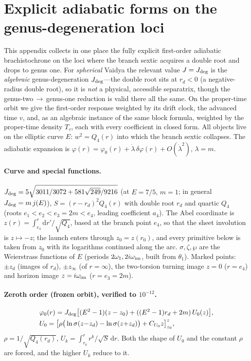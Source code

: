\documentclass[12pt]{iopart}
\newcommand{\Jc}{J_{\rm deg}}
\newcommand{\dd}{\mathrm{d}}
\theoremstyle{plain}
\theoremstyle{definition}
\theoremstyle{plain}
\theoremstyle{remark}
\begin{document}
\section{Explicit adiabatic forms on the genus-degeneration loci}
\label{app:degeneration}
This appendix collects in one place the fully explicit first-order adiabatic
brachistochrone on the loci where the branch sextic acquires a double root and drops to
genus one. For \emph{spherical} Vaidya the relevant value $J=\Jc$ is the \emph{algebraic}
genus-degeneration $J_{\rm deg}$---the double root sits at $r_d<0$
(a negative-radius double root), so it is \emph{not} a physical, accessible separatrix,
though the genus-two$\,\to\,$genus-one reduction is valid there all the same. On the
proper-time orbit we give the first-order response weighted by its drift clock, the
advanced time $v$, and, as an algebraic instance of the same block formula, weighted by the
proper-time density $T_\tau$, each with every coefficient in closed form. All objects live on
the elliptic curve $E:\,w^2=Q_4(r)$ into which the branch sextic collapses. The adiabatic expansion is
$\varphi(r)=\varphi_0(r)+\dot\lambda\,\delta\varphi(r)+O(\dot\lambda^2)$, $\lambda=m$.

\paragraph{Curve and special functions.}
$\Jc=5\sqrt{3011/3072+581\sqrt{249}/9216}$ (at $E=7/5,\,m=1$; in general $\Jc=m\,j(E)$),
$S=(r-r_d)^2Q_4(r)$ with double root $r_d$ and quartic $Q_4$ (roots
$e_1<e_2<e_3=2m<e_4$, leading coefficient $a_4$). The Abel coordinate is
$z(r)=\int_{e_4}^r\dd r'/\sqrt{Q_4}$, based at the branch point $e_4$, so that the sheet
involution is $z\mapsto-z$; the launch enters through $z_0=z(r_0)$, and every primitive
below is taken from $z_0$ with its logarithms continued along the arc. $\sigma,\zeta,\wp$
are the Weierstrass functions
of $E$ (periods $2\omega_1,2i\omega_{\rm im}$, built from $\theta_1$). Marked points:
$\pm z_d$ (images of $r_d$), $\pm z_\infty$ (of $r=\infty$), the two-torsion turning
image $z=0$ ($r=e_4$) and horizon image $z=i\omega_{\rm im}$ ($r=e_3=2m$).

\paragraph{Zeroth order (frozen orbit), verified to $10^{-12}$.}
\begin{equation}
\begin{aligned}
&\varphi_0(r)=\Jc\big[(E^2-1)(z-z_0)+((E^2-1)r_d+2m)\,U_0(z)\big],\\
&U_0=\big[\rho\big(\ln\sigma(z{-}z_d)-\ln\sigma(z{+}z_d)\big)+C_{U_0}z\big]_{z_0}^{z},
\end{aligned}
\end{equation}
$\rho=1/\sqrt{Q_4(r_d)}$, $U_k=\int_{r_0}^r r^k/\sqrt S\,\dd r$. Both the shape of $U_0$
and the constant $\rho$ are forced, and the higher $U_k$ reduce to it.
\end{document}
